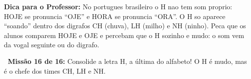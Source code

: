\begin{dica}
\textbf{Dica para o Professor:} No portugues brasileiro o H nao tem som proprio: HOJE se pronuncia ``OJE'' e HORA se pronuncia ``ORA''. O H so aparece ``soando'' dentro dos digrafos CH (chuva), LH (milho) e NH (ninho). Peca que os alunos comparem HOJE e OJE e percebam que o H sozinho e mudo: o som vem da vogal seguinte ou do digrafo.
\end{dica}





\begin{missao}
\textbf{\faGamepad~Miss\~a{}o 16 de 16:} Consolide a letra H, a \'ultima do alfabeto! O H \'e{} mudo, mas \'e{} o chefe dos times CH, LH e NH.
\end{missao}

